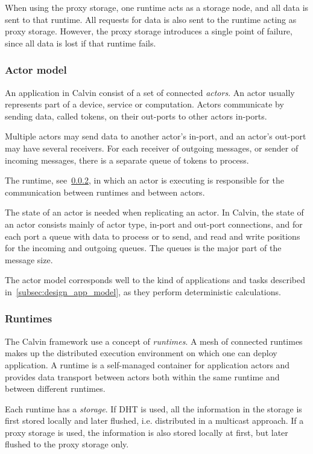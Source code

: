 \documentclass{cslthse-msc}
\begin{document}
When using the proxy storage, one runtime acts as a storage node, and all data is sent to that runtime. All requests for data is also sent to the runtime acting as proxy storage. However, the proxy storage introduces a single point of failure, since all data is lost if that runtime fails. %

\subsubsection{Actor model} \label{sec:calvin_actor}
An application in Calvin consist of a set of connected \emph{actors}. An actor usually represents part of a device, service or computation. Actors communicate by sending data, called tokens, on their out-ports to other actors in-ports. 

Multiple actors may send data to another actor's in-port, and an actor's out-port may have several receivers. For each receiver of outgoing messages, or sender of incoming messages, there is a separate queue of tokens to process.

The runtime, see~\cref{sec:calvin_runtime}, in which an actor is executing is responsible for the communication between runtimes and between actors.

The state of an actor is needed when replicating an actor. In Calvin, the state of an actor consists mainly of actor type, in-port and out-port connections, and for each port a queue with data to process or to send, and read and write positions for the incoming and outgoing queues. The queues is the major part of the message size.

The actor model corresponds well to the kind of applications and tasks described in~\cref{subsec:design_app_model}, as they perform deterministic calculations.

\subsubsection{Runtimes} \label{sec:calvin_runtime}
The Calvin framework use a concept of \emph{runtimes}. A mesh of connected runtimes makes up the distributed execution environment on which one can deploy application. A runtime is a self-managed container for application actors and provides data transport between actors both within the same runtime and between different runtimes.

Each runtime has a \emph{storage}. If DHT is used, all the information in the storage is first stored locally and later flushed, i.e. distributed in a multicast approach. If a proxy storage is used, the information is also stored locally at first, but later flushed to the proxy storage only.
\end{document}
